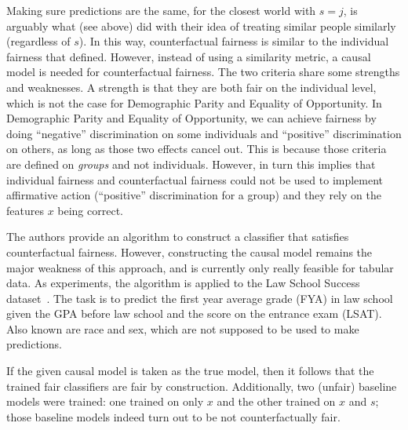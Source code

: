 Making sure predictions are the same, for the closest world with \(s=j\),
is arguably what \citet{dwork2012fairness} (see above) did
with their idea of treating similar people similarly (regardless of \(s\)).
In this way, counterfactual fairness is similar to the individual fairness
that \citet{dwork2012fairness} defined.
However, instead of using a similarity metric,
a causal model is needed for counterfactual fairness.
The two criteria share some strengths and weaknesses.
A strength is that they are both fair on the individual level,
which is not the case for Demographic Parity and Equality of Opportunity.
In Demographic Parity and Equality of Opportunity,
we can achieve fairness by doing ``negative'' discrimination on some individuals
and ``positive'' discrimination on others, as long as those two effects cancel out.
This is because those criteria are defined on \emph{groups} and not individuals.
However, in turn this implies that individual fairness and counterfactual fairness
could not be used to implement affirmative action (``positive'' discrimination for a group)
and they rely on the features \(x\) being correct.

The authors provide an algorithm to construct a classifier that satisfies counterfactual fairness.
However, constructing the causal model remains the major weakness of this approach,
and is currently only really feasible for tabular data.
As experiments, the algorithm is applied to the Law School Success dataset~\citep{wightman1998lsac}.
The task is to predict the first year average grade (FYA) in law school
given the GPA before law school and the score on the entrance exam (LSAT).
Also known are race and sex, which are not supposed to be used to make predictions.

If the given causal model is taken as the true model,
then it follows that the trained fair classifiers are fair by construction.
Additionally, two (unfair) baseline models were trained:
one trained on only \(x\) and the other trained on \(x\) and \(s\);
those baseline models indeed turn out to be not counterfactually fair.

